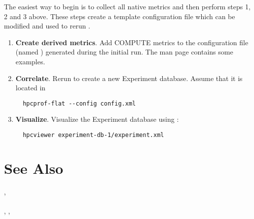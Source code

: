 \documentclass[english]{article}
\begin{document}
The easiest way to begin is to collect all native metrics and then perform steps 1, 2 and 3 above.
These steps create a template  configuration file which can be modified and used to rerun .

\begin{enumerate}
\item \textbf{Create derived metrics}.  Add COMPUTE metrics to the  configuration file (named ) generated during the initial run.  The  man page contains some examples. 

\item \textbf{Correlate}. Rerun  to create a new Experiment database.  Assume that it is located in 
\begin{verbatim}
  hpcprof-flat --config config.xml
\end{verbatim}

\item \textbf{Visualize}.
Visualize the Experiment database using :
\begin{verbatim}
  hpcviewer experiment-db-1/experiment.xml
\end{verbatim}

\end{enumerate}



\section{See Also}

,  \\
 \\
, ,  \\ %
\end{document}
